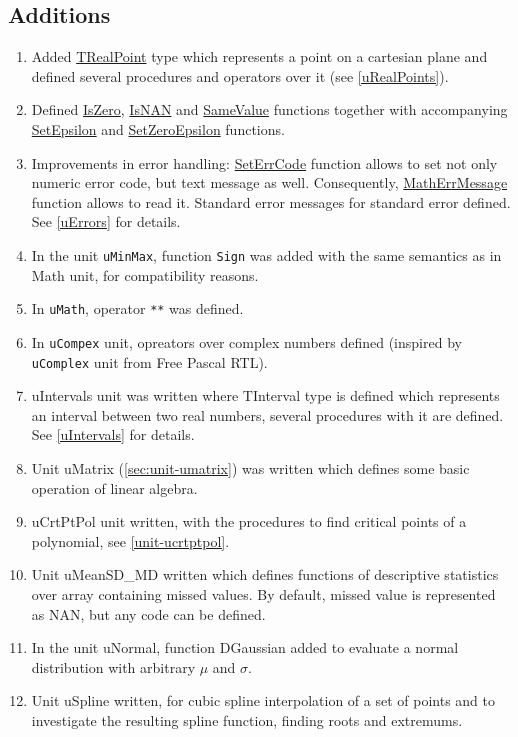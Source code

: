 \documentclass[12pt,a4paper,oneside]{report}
\newcommand{\code}[1]{\texttt{#1}}
\begin{document}
\subsection*{Additions}
\begin{enumerate}
\item Added \hyperref[types:trealpoint]{TRealPoint} type which represents a point on a cartesian plane and defined several procedures and operators over it (see \ref{uRealPoints}).
\item Defined \hyperref[utypes-IsZero]{IsZero}, \hyperref[utypes-IsNan]{IsNAN} and \hyperref[utypes-SameValue]{SameValue} functions together with accompanying \hyperref[utypes-SetEpsilon]{SetEpsilon} and \hyperref[utypes-SetZeroEpsilon]{SetZeroEpsilon} functions.
\item Improvements in error handling: \hyperref[uErrors-SetErrCode]{SetErrCode} function allows to set not only numeric error code, but text message as well. Consequently, \hyperref[uErrors-MathErrMessage]{MathErrMessage} function allows to read it.  Standard error messages for standard error defined. See \ref{uErrors} for details.
\item In the unit \code{uMinMax}, function \code{Sign} was added with the same semantics as in Math unit, for compatibility reasons.
\item In \code{uMath}, operator \code{**} was defined.
\item In \code{uCompex} unit, opreators over complex numbers defined (inspired by \\ \code{uComplex} unit from Free Pascal RTL).
\item uIntervals unit was written where TInterval type is defined which represents an interval between two real numbers, several procedures with it are defined. See \ref{uIntervals} for details.
\item Unit uMatrix (\ref{sec:unit-umatrix}) was written which defines some basic operation of linear algebra.
\item uCrtPtPol unit written, with the procedures to find critical points of a polynomial, see \ref{unit-ucrtptpol}.
\item Unit uMeanSD{\_}MD written which defines functions of descriptive statistics over array containing missed values. By default, missed value is represented as NAN, but any code can be defined.
\item In the unit uNormal, function DGaussian added to evaluate a normal distribution with arbitrary $\mu$ and $\sigma$.
\item Unit uSpline written, for cubic spline interpolation of a set of points and to investigate the resulting spline function, finding roots and extremums.

\end{enumerate}
\end{document}
